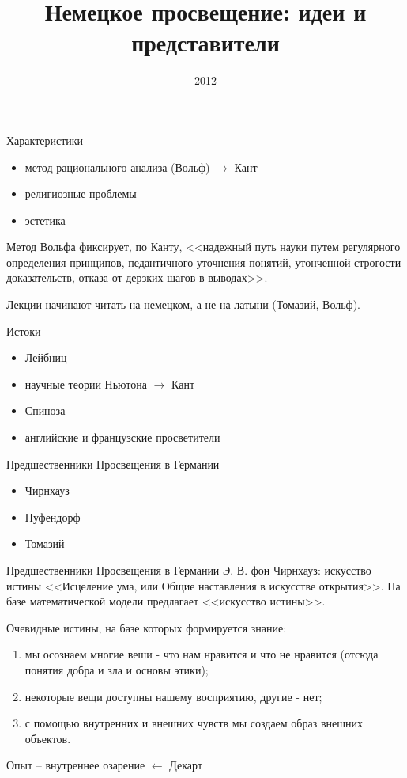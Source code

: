 \documentclass{beamer}
\title[Немецкое просвещение]{Немецкое просвещение: идеи и представители}
\date{2012}
\begin{document}
    \begin{frame}
        \titlepage
    \end{frame}

    \begin{frame}{Характеристики}
        \begin{itemize}
        \item метод рационального анализа (Вольф) $\rightarrow$ Кант
        \item религиозные проблемы
        \item эстетика
        \end{itemize}
        Метод Вольфа фиксирует, по Канту,
        <<надежный путь науки путем регулярного определения принципов,
        педантичного уточнения понятий, утонченной строгости доказательств,
        отказа от дерзких шагов в выводах>>.

        Лекции начинают читать на немецком, а не на латыни (Томазий, Вольф).
    \end{frame}

    \begin{frame}{Истоки}
        \begin{itemize}
        \item Лейбниц
        \item научные теории Ньютона $\rightarrow$ Кант
        \item Спиноза
        \item английские и французские просветители
        \end{itemize}
    \end{frame}

    \begin{frame}{Предшественники Просвещения в Германии}
        \begin{itemize}
        \item Чирнхауз
        \item Пуфендорф
        \item Томазий
        \end{itemize}
    \end{frame}

    \begin{frame}{Предшественники Просвещения в Германии}
            {Э. В. фон Чирнхауз: искусство истины}
        <<Исцеление ума, или Общие наставления в искусстве открытия>>.
        На базе математической модели предлагает <<искусство истины>>.

        Очевидные истины, на базе которых формируется знание:
        \begin{enumerate}
        \item мы осознаем многие веши - что нам нравится и что не нравится
            (отсюда понятия добра и зла и основы этики);
        \item некоторые вещи доступны нашему восприятию, другие - нет;
        \item с помощью внутренних и внешних чувств
            мы создаем образ внешних объектов.
        \end{enumerate}
        Опыт -- внутреннее озарение $\leftarrow$ Декарт
    \end{frame}
\end{document}
